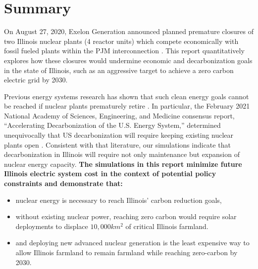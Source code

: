 \section{Summary}
On August 27, 2020, Exelon Generation announced planned premature closures of 
two Illinois nuclear plants (4 reactor units) which compete economically with 
fossil fueled plants within the \gls{PJM} interconnection \cite{larson_exelon_2020}. 
This report quantitatively explores how these closures would undermine economic 
and decarbonization goals in the state of Illinois, such as an aggressive 
target to achieve a zero carbon electric grid by 2030.

Previous energy systems research has shown that such clean energy goals cannot 
be reached if nuclear plants prematurely retire 
\cite{national_academies_of_sciences_engineering_and_medicine_2021_accelerating_2021,larson_net-zero_2020,davis_net-zero_2018}.  
In particular, the February 2021 National Academy of Sciences, Engineering, and 
Medicine consensus report, ``Accelerating Decarbonization of the U.S. Energy 
System,'' determined unequivocally that US decarbonization will require keeping 
existing nuclear plants open 
\cite{national_academies_of_sciences_engineering_and_medicine_2021_accelerating_2021}. 
Consistent with that literature, our simulations indicate that decarbonization 
in Illinois will require not only maintenance but expansion of nuclear energy capacity. 
\textbf{The simulations in this report minimize future Illinois electric system 
cost in the context of potential policy constraints and demonstrate that:}

\begin{itemize}
        \item nuclear energy is necessary to reach Illinois' carbon reduction 
                goals,
        \item without existing nuclear power, reaching zero carbon would 
                require solar deployments to displace $10,000km^2$ of critical 
                Illinois 
                farmland.
        \item and deploying new advanced nuclear generation is the least expensive way to 
                allow Illinois farmland to remain farmland while reaching 
                zero-carbon by 2030.
  \end{itemize}

